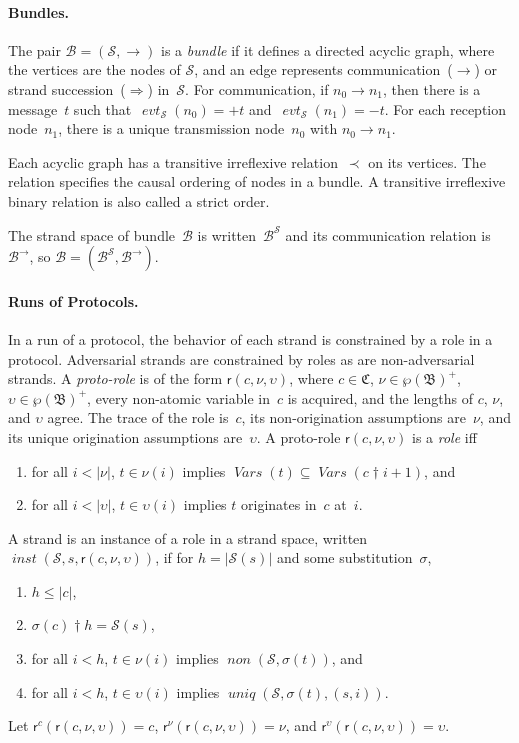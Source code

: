 \documentclass[12pt]{article}
\newcommand{\fn}[1]{\ensuremath{\operatorname{\mathit{#1}}}}
\newcommand{\vars}{\fn{Vars}}
\newcommand{\prefix}[2]{#1\dagger#2}
\newcommand{\inbnd}{\mathord -}
\newcommand{\outbnd}{\mathord +}
\newcommand{\pow}[1]{\wp(#1)}
\newcommand{\alg}[1]{\ensuremath{\mathfrak{#1}}}
\newcommand{\atm}{\alg{B}}
\newcommand{\ssp}{\ensuremath{\mathcal{S}}}
\newcommand{\bun}{\ensuremath{\mathcal{B}}}
\newcommand{\tr}{\ensuremath{\mathfrak C}}
\newcommand{\evt}{\fn{evt}}
\newcommand{\role}{\mathsf{r}}
\begin{document}
\paragraph{Bundles.}
The pair $\bun=(\ssp,\to)$ is a \emph{bundle} if it defines a directed
acyclic graph, where the vertices are the nodes of $\ssp$, and an edge
represents communication~($\rightarrow$) or strand
succession~($\Rightarrow$) in~$\ssp$.  For communication, if
$n_0\rightarrow n_1$, then there is a message~$t$ such
that~$\evt_\ssp(n_0)=\outbnd t$ and~$\evt_\ssp(n_1)=\inbnd t$.  For
each reception node~$n_1$, there is a unique transmission node~$n_0$
with $n_0\rightarrow n_1$.

Each acyclic graph has a transitive irreflexive relation~$\prec$ on
its vertices.  The relation specifies the causal ordering of nodes in
a bundle.  A transitive irreflexive binary relation is also called a
strict order.

The strand space of bundle~{\bun} is written~$\bun^\ssp$ and its
communication relation is~$\bun^\to$, so
$\bun=(\bun^\ssp,\bun^\to)$.

\paragraph{Runs of Protocols.}
In a run of a protocol, the behavior of each strand is constrained by
a role in a protocol.  Adversarial strands are constrained by roles as
are non-adversarial strands.  A \emph{proto-role} is of the form
$\role(c,\nu,\upsilon)$, where $c\in\tr$, $\nu\in\pow{\atm}^+$,
$\upsilon\in\pow{\atm}^+$, every non-atomic variable in~$c$ is
acquired, and the lengths of $c$, $\nu$, and $\upsilon$ agree.  The
trace of the role is~$c$, its non-origination assumptions are~$\nu$,
and its unique origination assumptions are~$\upsilon$.  A proto-role
$\role(c,\nu,\upsilon)$ is a \emph{role} iff
\begin{enumerate}
\item for all $i<|\nu|$, $t\in \nu(i)$ implies
  $\vars(t)\subseteq\vars(\prefix{c}{i+1})$, and
\item for all $i<|\upsilon|$, $t\in \upsilon(i)$ implies
  $t$ originates in~$c$ at~$i$.
\end{enumerate}

A strand is an instance of a role in a strand space, written
$\fn{inst}(\ssp,s,\role(c,\nu,\upsilon))$, if for $h=|\ssp(s)|$ and
some substitution~$\sigma$,
\begin{enumerate}
\item $h\leq|c|$,
\item $\prefix{\sigma(c)}{h}=\ssp(s)$,
\item for all $i<h$, $t\in \nu(i)$ implies $\fn{non}(\ssp,\sigma(t))$, and
\item for all $i<h$, $t\in \upsilon(i)$ implies
  $\fn{uniq}(\ssp,\sigma(t),(s,i))$.
\end{enumerate}
Let $\role^c(\role(c,\nu,\upsilon))=c$,
$\role^\nu(\role(c,\nu,\upsilon))=\nu$, and
$\role^\upsilon(\role(c,\nu,\upsilon))=\upsilon$.
\end{document}
